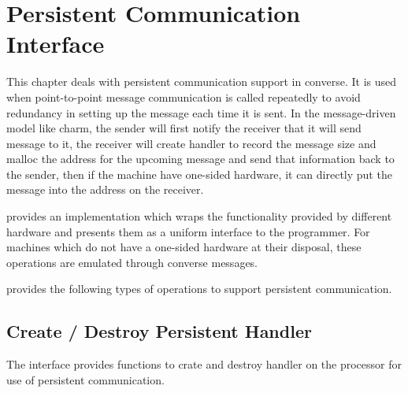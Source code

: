 
\chapter{\converse{} Persistent Communication Interface}

This chapter deals with persistent communication support in converse. It is used when point-to-point message communication is called repeatedly to avoid redundancy in setting up the message each time it is sent. In the message-driven model like charm, the sender will first notify the receiver that it will send message to it, the receiver will create handler to record the message size and malloc the address for the upcoming message and send that information back to the sender, then if the machine have one-sided hardware, it can directly put the message into the address on the receiver.

\converse{} provides an implementation which wraps the functionality provided
by different hardware and presents them as a uniform interface to the
programmer. For machines which do not have a one-sided hardware at their
disposal, these operations are emulated through converse messages.

\converse{} provides the following types of operations to support persistent
communication.


\section{Create / Destroy Persistent Handler}
The interface provides functions to crate and destroy handler on the processor for use of persistent communication.



